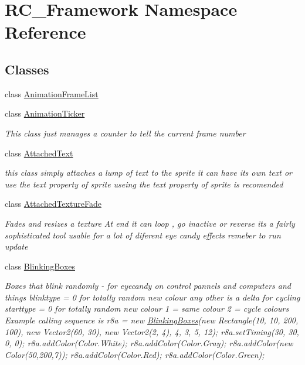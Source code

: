 \hypertarget{namespace_r_c___framework}{}\section{R\+C\+\_\+\+Framework Namespace Reference}
\label{namespace_r_c___framework}
\subsection*{Classes}
\begin{DoxyCompactItemize}
\item 
class \mbox{\hyperlink{class_r_c___framework_1_1_animation_frame_list}{Animation\+Frame\+List}}
\item 
class \mbox{\hyperlink{class_r_c___framework_1_1_animation_ticker}{Animation\+Ticker}}
\begin{DoxyCompactList}\small\item\em This class just manages a counter to tell the current frame number \end{DoxyCompactList}\item 
class \mbox{\hyperlink{class_r_c___framework_1_1_attached_text}{Attached\+Text}}
\begin{DoxyCompactList}\small\item\em this class simply attaches a lump of text to the sprite it can have its own text or use the text property of sprite useing the text property of sprite is recomended \end{DoxyCompactList}\item 
class \mbox{\hyperlink{class_r_c___framework_1_1_attached_texture_fade}{Attached\+Texture\+Fade}}
\begin{DoxyCompactList}\small\item\em Fades and resizes a texture At end it can loop , go inactive or reverse its a fairly sophisticated tool usable for a lot of diferent eye candy effects remeber to run update \end{DoxyCompactList}\item 
class \mbox{\hyperlink{class_r_c___framework_1_1_blinking_boxes}{Blinking\+Boxes}}
\begin{DoxyCompactList}\small\item\em Boxes that blink randomly -\/ for eyecandy on control pannels and computers and things blinktype = 0 for totally random new colour any other is a delta for cycling starttype = 0 for totally random new colour 1 = same colour 2 = cycle colours Example calling sequence is r8a = new \mbox{\hyperlink{class_r_c___framework_1_1_blinking_boxes}{Blinking\+Boxes}}(new Rectangle(10, 10, 200, 100), new Vector2(60, 30), new Vector2(2, 4), 4, 3, 5, 12); r8a.\+set\+Timing(30, 30, 0, 0); r8a.\+add\+Color(Color.\+White); r8a.\+add\+Color(Color.\+Gray); r8a.\+add\+Color(new Color(50,200,7)); r8a.\+add\+Color(Color.\+Red); r8a.\+add\+Color(Color.\+Green); \end{DoxyCompactList}\item 

\end{DoxyCompactItemize}
